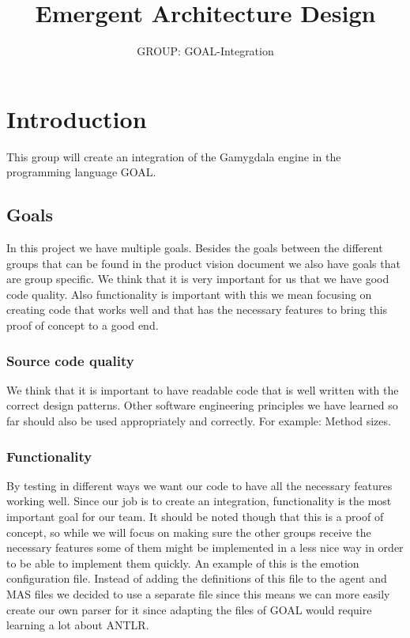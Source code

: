 \documentclass[]{article}
\title{Emergent Architecture Design}
\author{GROUP: GOAL-Integration}
\begin{document}
\maketitle

\section{Introduction}
This group will create an integration of the \gls{Gamygdala} engine in the programming language \gls{GOAL}.
\subsection{Goals}
In this project we have multiple goals. Besides the goals between the different groups that can be found in the product vision document we also have goals that are group specific. We think that it is very important for us that we have good code quality. Also functionality is important with this we mean focusing on creating code that works well and that has the necessary features to bring this proof of concept to a good end.

\subsubsection{Source code quality}
We think that it is important to have readable code that is well written with the correct design patterns. Other software engineering principles we have learned so far should also be used appropriately and correctly. For example: Method sizes.

\subsubsection{Functionality}
By testing in different ways we want our code to have all the necessary features working well. Since our job is to create an integration, functionality is the most important goal for our team. It should be noted though that this is a proof of concept, so while we will focus on making sure the other groups receive the necessary features some of them might be implemented in a less nice way in order to be able to implement them quickly. An example of this is the emotion configuration file. Instead of adding the definitions of this file to the agent and MAS files we decided to use a separate file since this means we can more easily create our own parser for it since adapting the files of GOAL would require learning a lot about \gls{ANTLR}.
\end{document}
